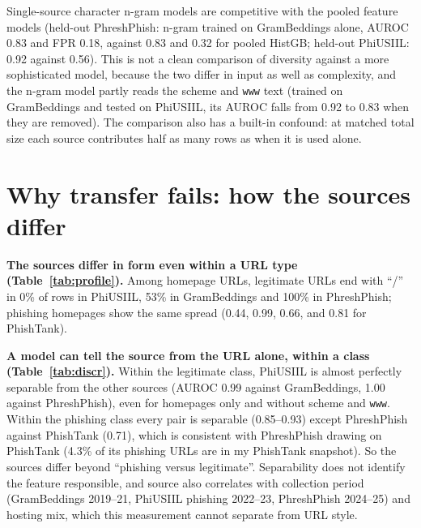 \documentclass[10pt]{article}
\begin{document}
Single-source character n-gram models are competitive with the pooled feature models (held-out PhreshPhish: n-gram trained on GramBeddings alone, AUROC 0.83 and FPR 0.18, against 0.83 and 0.32 for pooled HistGB; held-out PhiUSIIL: 0.92 against 0.56). This is not a clean comparison of diversity against a more sophisticated model, because the two differ in input as well as complexity, and the n-gram model partly reads the scheme and \texttt{www} text (trained on GramBeddings and tested on PhiUSIIL, its AUROC falls from 0.92 to 0.83 when they are removed). The comparison also has a built-in confound: at matched total size each source contributes half as many rows as when it is used alone.

\begin{table}[t]
\centering
\caption{Single-source and pooled training on the held-out source (features all; mean$\pm$sd over five seeds; matched total pool size 11,666; threshold fixed at 95\% recall on the training sources' (pooled) validation data). Recall and FPR are at that threshold.}
\label{tab:comb}

\end{table}

\section{Why transfer fails: how the sources differ}\label{sec:why}
\textbf{The sources differ in form even within a URL type (Table~\ref{tab:profile}).} Among homepage URLs, legitimate URLs end with ``/'' in 0\% of rows in PhiUSIIL, 53\% in GramBeddings and 100\% in PhreshPhish; phishing homepages show the same spread (0.44, 0.99, 0.66, and 0.81 for PhishTank).

\textbf{A model can tell the source from the URL alone, within a class (Table~\ref{tab:discr}).} Within the legitimate class, PhiUSIIL is almost perfectly separable from the other sources (AUROC 0.99 against GramBeddings, 1.00 against PhreshPhish), even for homepages only and without scheme and \texttt{www}. Within the phishing class every pair is separable (0.85--0.93) except PhreshPhish against PhishTank (0.71), which is consistent with PhreshPhish drawing on PhishTank (4.3\% of its phishing URLs are in my PhishTank snapshot). So the sources differ beyond ``phishing versus legitimate''. Separability does not identify the feature responsible, and source also correlates with collection period (GramBeddings 2019--21, PhiUSIIL phishing 2022--23, PhreshPhish 2024--25) and hosting mix, which this measurement cannot separate from URL style.
\end{document}
